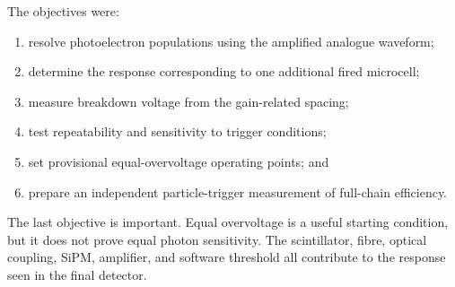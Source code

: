 The objectives were:

\begin{enumerate}[leftmargin=*]
  \item resolve photoelectron populations using the amplified analogue waveform;
  \item determine the response corresponding to one additional fired microcell;
  \item measure breakdown voltage from the gain-related spacing;
  \item test repeatability and sensitivity to trigger conditions;
  \item set provisional equal-overvoltage operating points; and
  \item prepare an independent particle-trigger measurement of full-chain efficiency.
\end{enumerate}

The last objective is important. Equal overvoltage is a useful starting condition, but it does not prove equal photon sensitivity. The scintillator, fibre, optical coupling, SiPM, amplifier, and software threshold all contribute to the response seen in the final detector.
